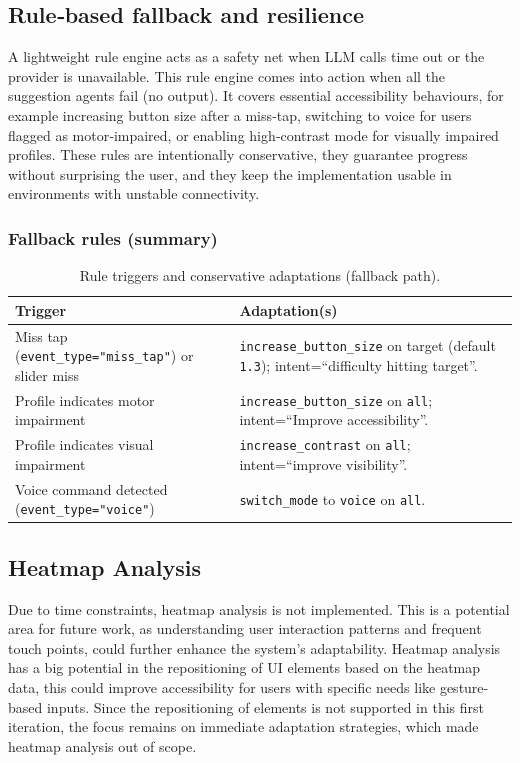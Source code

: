 \documentclass[openany]{book}
\begin{document}
\subsection{Rule‑based fallback and resilience}
A lightweight rule engine acts as a safety net when LLM calls time out or the provider is unavailable. This rule engine comes into action when all the suggestion agents fail (no output). It covers essential accessibility behaviours, for example increasing button size after a miss‑tap, switching to voice for users flagged as motor‑impaired, or enabling high‑contrast mode for visually impaired profiles. These rules are intentionally conservative, they guarantee progress without surprising the user, and they keep the implementation usable in environments with unstable connectivity.

\subsubsection*{Fallback rules (summary)}
\begin{table}[H]
\centering
\caption{Rule triggers and conservative adaptations (fallback path).}
\begin{tabular}{p{5.7cm}p{9.2cm}}
\toprule
\textbf{Trigger} & \textbf{Adaptation(s)} \\
\midrule
Miss tap (\texttt{event\_type="miss\_tap"}) or slider miss & \texttt{increase\_button\_size} on target (default \texttt{1.3}); intent=``difficulty hitting target''. \\
Profile indicates motor impairment & \texttt{increase\_button\_size} on \texttt{all}; intent=``Improve accessibility''. \\
Profile indicates visual impairment & \texttt{increase\_contrast} on \texttt{all}; intent=``improve visibility''. \\
Voice command detected (\texttt{event\_type="voice"}) & \texttt{switch\_mode} to \texttt{voice} on \texttt{all}. \\
\bottomrule
\end{tabular}
\end{table}

\subsection{Heatmap Analysis}
Due to time constraints, heatmap analysis is not implemented. This is a potential area for future work, as understanding user interaction patterns and frequent touch points, could further enhance the system's adaptability. Heatmap analysis has a big potential in the repositioning of UI elements based on the heatmap data, this could improve accessibility for users with specific needs like gesture-based inputs. Since the repositioning of elements is not supported in this first iteration, the focus remains on immediate adaptation strategies, which made heatmap analysis out of scope.
\end{document}

